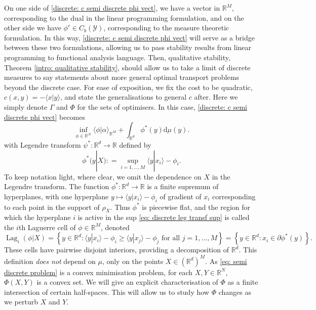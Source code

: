 \documentclass[11pt, oneside, titlepage]{book}
\theoremstyle{plain}
\theoremstyle{definition}
\newcommand{\R}{\mathbb{R}}
\newcommand{\Y}{\mathcal{Y}}
\newcommand{\di}{\mathrm{d}}
\DeclareMathOperator{\lag}{Lag}
\begin{document}
 On one side of \eqref{discrete: c semi discrete phi vect}, we have a vector in $\R^M$, corresponding to the dual in the linear programming formulation, and on the other side we have $\phi^c \in C_b(\Y)$, corresponding to the measure theoretic formulation. In this way, \eqref{discrete: c semi discrete phi vect} will serve as a bridge between these two formulations, allowing us to pass stability results from linear programming to functional analysis language. Then, qualitative stability, Theorem \ref{intro: qualitative stability}, should allow us to take a limit of discrete measures to say statements about more general optimal transport problems beyond the discrete case. For ease of exposition, we fix the cost to be quadratic, $c(x, y) = -\langle x | y \rangle$, and state the generalisations to general $c$ after. Here we simply denote $\Gamma$ and $\Phi$ for the sets of optimisers. In this case, \eqref{discrete: c semi discrete phi vect} becomes
\begin{equation}
\label{eq: semi discrete problem}
    \inf_{\phi \in \R^N} \langle \phi | \alpha\rangle_{\R^M} + \int_{\R^d} \phi^*(y) \di \mu(y).
\end{equation}
with Legendre transform $\psi^* : \R^d \to \R$ defined by
    \begin{equation}
    \label{eq: discrete leg transf sup}
        \phi^*(y |X) : = \sup_{i = 1,..., M} \langle y | x_i \rangle - \phi_i.
    \end{equation}
To keep notation light, where clear, we omit the dependence on $X$ in the Legendre transform. The function $\phi^* : \R^d \to \R$ is a finite supremum of hyperplanes, with one hyperplane $y \mapsto \langle y | x_i \rangle - \phi_i$ of gradient of $x_i$  corresponding to each point in the support of $\rho_X$. Thus $\phi^*$ is piecewise flat, and the region for which the hyperplane $i$ is active in the sup \eqref{eq: discrete leg transf sup} is called the $i$th Laguerre cell of $\phi \in \R^M$, denoted
\begin{equation*}
    \lag_i(\phi | X) = \left\{ y \in \R^d :  \langle y | x_i \rangle - \phi_i \geq \langle y | x_j \rangle - \phi_j \text{ for all } j = 1,..., M \right\} = \left\{ y \in \R^d : x_i \in \partial \phi^*(y) \right\}.
\end{equation*}
These cells have pairwise disjoint interiors, providing a decomposition of $\R^d$. This definition \textit{does not} depend on $\mu$, only on the points $X \in (\R^d)^M$. As \eqref{eq: semi discrete problem} is a convex minimisation problem, for each $X, Y \in \R^N$, $\Phi(X, Y)$ is a convex set. We will give an explicit characterisation of $\Phi$ as a finite intersection of certain half-spaces. This will allow us to study how $\Phi$ changes as we perturb $X$ and $Y$. 
\end{document}
